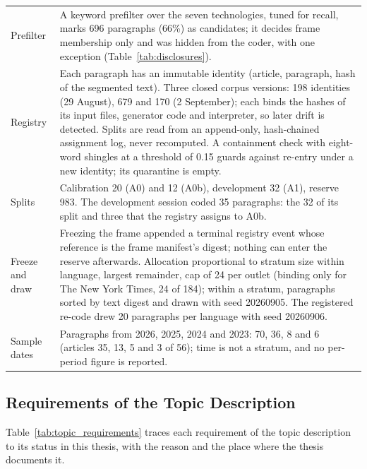 \begin{longtable}{@{}>{\raggedright\arraybackslash}p{30mm}>{\raggedright\arraybackslash}p{124mm}@{}}
Prefilter & A keyword prefilter over the seven technologies, tuned for recall, marks 696 paragraphs (66\%) as candidates; it decides frame membership only and was hidden from the coder, with one exception (Table~\ref{tab:disclosures}). \\
Registry & Each paragraph has an immutable identity (article, paragraph, hash of the segmented text). Three closed corpus versions: 198 identities (29 August), 679 and 170 (2 September); each binds the hashes of its input files, generator code and interpreter, so later drift is detected. Splits are read from an append-only, hash-chained assignment log, never recomputed. A containment check with eight-word shingles at a threshold of 0.15 guards against re-entry under a new identity; its quarantine is empty. \\
Splits & Calibration 20 (A0) and 12 (A0b), development 32 (A1), reserve 983. The development session coded 35 paragraphs: the 32 of its split and three that the registry assigns to A0b. \\
Freeze and draw & Freezing the frame appended a terminal registry event whose reference is the frame manifest's digest; nothing can enter the reserve afterwards. Allocation proportional to stratum size within language, largest remainder, cap of 24 per outlet (binding only for The New York Times, 24 of 184); within a stratum, paragraphs sorted by text digest and drawn with seed 20260905. The registered re-code drew 20 paragraphs per language with seed 20260906. \\
Sample dates & Paragraphs from 2026, 2025, 2024 and 2023: 70, 36, 8 and 6 (articles 35, 13, 5 and 3 of 56); time is not a stratum, and no per-period figure is reported. \\
\end{longtable}
\endgroup



\subsection{Requirements of the Topic Description}\label{app:topic_requirements}

Table~\ref{tab:topic_requirements} traces each requirement of the topic description to its status in this thesis, with the reason and the place where the thesis documents it.

